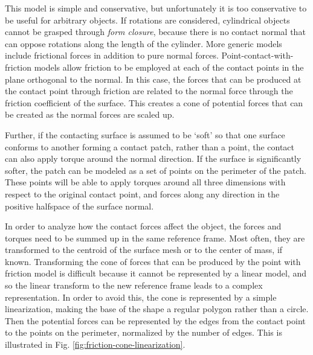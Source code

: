 This model is simple and conservative, but unfortunately it is too conservative to be useful for arbitrary objects. If rotations are considered, cylindrical objects cannot be grasped through \emph{form closure}, because there is no contact normal that can oppose rotations along the length of the cylinder. More generic models include frictional forces in addition to pure normal forces. Point-contact-with-friction models allow friction to be employed at each of the contact points in the plane orthogonal to the normal. In this case, the forces that can be produced at the contact point through friction are related to the normal force through the friction coefficient of the surface. This creates a cone of potential forces that can be created as the normal forces are scaled up. 

Further, if the contacting surface is assumed to be `soft' so that one surface conforms to another forming a contact patch, rather than a point, the contact can also apply torque around the normal direction.  If the surface is significantly softer, the patch can be modeled as a set of points on the perimeter of the patch. These points will be able to apply torques around all three dimensions with respect to the original contact point, and forces along any direction in the positive halfspace of the surface normal.  

In order to analyze how the contact forces affect the object, the forces and torques need to be summed up in the same reference frame. Most often, they are transformed to the centroid of the surface mesh or to the center of mass, if known. Transforming the cone of forces that can be produced by the point with friction model is difficult because it cannot be represented by a linear model, and so the linear transform to the new reference frame leads to a complex representation. In order to avoid this, the cone is represented by a simple linearization, making the base of the shape a regular polygon rather than a circle. Then the potential forces can be represented by the edges from the contact point to the points on the perimeter, normalized by the number of edges. This is illustrated in Fig. \ref{fig:friction-cone-linearization}. 

